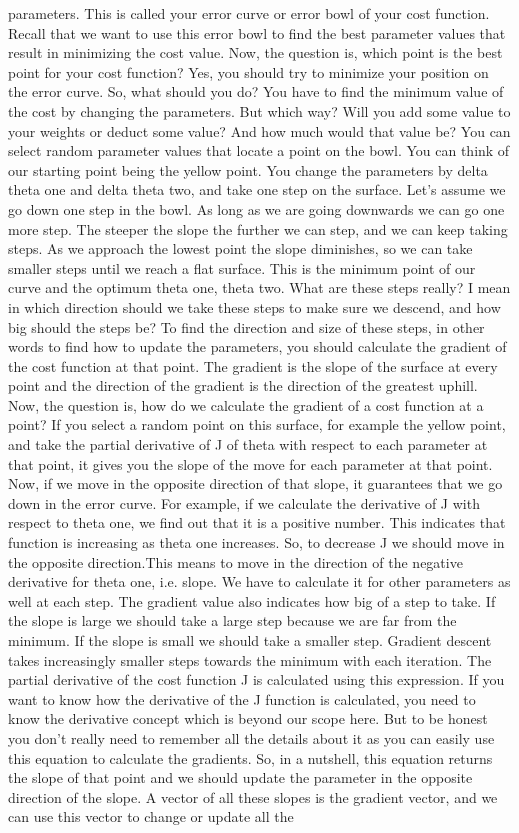 parameters. This is called your error curve or error bowl of your cost function. Recall that we want to use this error bowl to find the best parameter values that result in minimizing the cost value. Now, the question is, which point is the best point for your cost function? Yes, you should try to minimize your position on the error curve. So, what should you do? You have to find the minimum value of the cost by changing the parameters. But which way? Will you add some value to your weights or deduct some value? And how much would that value be? You can select random parameter values that locate a point on the bowl. You can think of our starting point being the yellow point. You change the parameters by delta theta one and delta theta two, and take one step on the surface. Let's assume we go down one step in the bowl. As long as we are going downwards we can go one more step. The steeper the slope the further we can step, and we can keep taking steps. As we approach the lowest point the slope diminishes, so we can take smaller steps until we reach a flat surface. This is the minimum point of our curve and the optimum theta one, theta two. What are these steps really? I mean in which direction should we take these steps to make sure we descend, and how big should the steps be? To find the direction and size of these steps, in other words to find how to update the parameters, you should calculate the gradient of the cost function at that point. The gradient is the slope of the surface at every point and the direction of the gradient is the direction of the greatest uphill. Now, the question is, how do we calculate the gradient of a cost function at a point? If you select a random point on this surface, for example the yellow point, and take the partial derivative of J of theta with respect to each parameter at that point, it gives you the slope of the move for each parameter at that point. Now, if we move in the opposite direction of that slope, it guarantees that we go down in the error curve. For example, if we calculate the derivative of J with respect to theta one, we find out that it is a positive number. This indicates that function is increasing as theta one increases. So, to decrease J we should move in the opposite direction.This means to move in the direction of the negative derivative for theta one, i.e. slope. We have to calculate it for other parameters as well at each step. The gradient value also indicates how big of a step to take. If the slope is large we should take a large step because we are far from the minimum. If the slope is small we should take a smaller step. Gradient descent takes increasingly smaller steps towards the minimum with each iteration. The partial derivative of the cost function J is calculated using this expression. If you want to know how the derivative of the J function is calculated, you need to know the derivative concept which is beyond our scope here. But to be honest you don't really need to remember all the details about it as you can easily use this equation to calculate the gradients. So, in a nutshell, this equation returns the slope of that point and we should update the parameter in the opposite direction of the slope. A vector of all these slopes is the gradient vector, and we can use this vector to change or update all the 